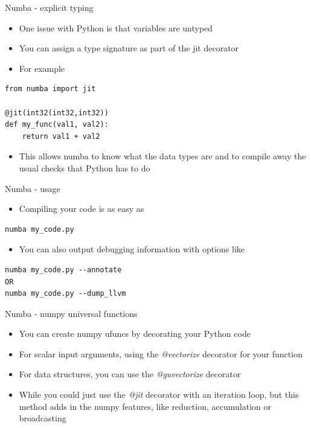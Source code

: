 \documentclass[presentation]{beamer}
\begin{document}
\begin{frame}[label=numba---explicit-typing,fragile]{Numba - explicit typing}
 \begin{itemize}
\item One issue with Python is that variables are untyped
\item You can assign a type signature as part of the jit decorator
\item For example
\end{itemize}

\begin{verbatim}
from numba import jit

@jit(int32(int32,int32))
def my_func(val1, val2):
    return val1 + val2
\end{verbatim}

\begin{itemize}
\item This allows numba to know what the data types are and to compile away
the usual checks that Python has to do
\end{itemize}
\end{frame}
\begin{frame}[label=numba---usage,fragile]{Numba - usage}
 \begin{itemize}
\item Compiling your code is as easy as
\end{itemize}

\begin{verbatim}
numba my_code.py
\end{verbatim}

\begin{itemize}
\item You can also output debugging information with options like
\end{itemize}

\begin{verbatim}
numba my_code.py --annotate
OR
numba my_code.py --dump_llvm
\end{verbatim}
\end{frame}
\begin{frame}[label=numba---numpy-universal-functions]{Numba - numpy universal functions}
\begin{itemize}
\item You can create numpy ufuncs by decorating your Python code
\item For scalar input arguments, using the \textit{@vectorize}
decorator for your function
\item For data structures, you can use the \textit{@guvectorize}
decorator
\item While you could just use the \textit{@jit} decorator with an
iteration loop, but this method adds in the numpy features, like
reduction, accumulation or broadcasting
\end{itemize}
\end{frame}
\end{document}
